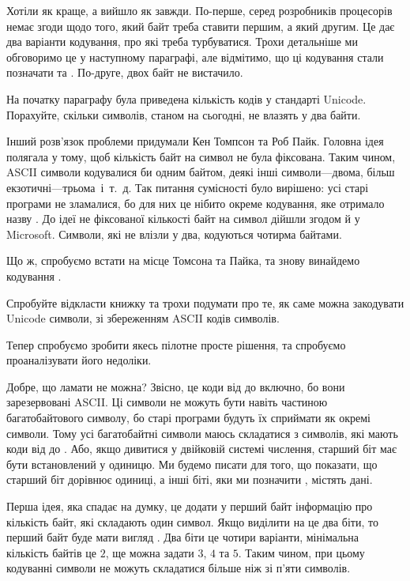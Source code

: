 Хотіли як краще, а вийшло як завжди.
По-перше, серед розробників процесорів немає згоди щодо того, який байт треба ставити першим, а який другим.
Це дає два варіанти кодування, про які треба турбуватися.
Трохи детальніше ми обговоримо це у наступному параграфі, але відмітимо, що ці кодування стали позначати  та .
По-друге, двох байт не вистачило.

\begin{exercise}
На початку параграфу була приведена кількість кодів у стандарті Unicode.
Порахуйте, скільки символів, станом на сьогодні, не влазять у два байти.
\end{exercise}

Інший розв'язок проблеми придумали Кен Томпсон та Роб Пайк.
Головна ідея полягала у тому, щоб кількість байт на символ не була фіксована.
Таким чином, ASCII символи кодувалися би одним байтом, деякі інші символи---двома, більш екзотичні---трьома~і~т.~д.
Так питання сумісності було вирішено: усі старі програми не зламалися, бо для них це нібито окреме кодування, яке отримало назву .
До ідеї не фіксованої кількості байт на символ дійшли згодом й у Microsoft.
Символи, які не влізли у два, кодуються чотирма байтами.

Що ж, спробуємо встати на місце Томсона та Пайка, та знову винайдемо кодування .

\begin{exercise}
Спробуйте відкласти книжку та трохи подумати про те, як саме можна закодувати Unicode символи, зі збереженням ASCII кодів символів.
\end{exercise}

Тепер спробуємо зробити якесь пілотне просте рішення, та спробуємо проаналізувати його недоліки.

Добре, що ламати не можна?
Звісно, це коди від  до  включно, бо вони зарезервовані ASCII.
Ці символи не можуть бути навіть частиною багатобайтового символу, бо старі програми будуть їх сприймати як окремі символи.
Тому усі багатобайтні символи маюсь складатися з символів, які мають коди від  до .
Або, якщо дивитися у двійковій системі числення, старший біт має бути встановлений у одиницю.
Ми будемо писати  для того, що показати, що старший біт дорівнює одиниці, а інші біті, яки ми позначити , містять дані.

Перша ідея, яка спадає на думку, це додати у перший байт інформацію про кількість байт, які складають один символ.
Якщо виділити на це два біти, то перший байт буде мати вигляд .
Два біти це чотири варіанти, мінімальна кількість байтів це $2$, ще можна задати $3$, $4$ та $5$.
Таким чином, при цьому кодуванні символи не можуть складатися більше ніж зі п'яти символів.

